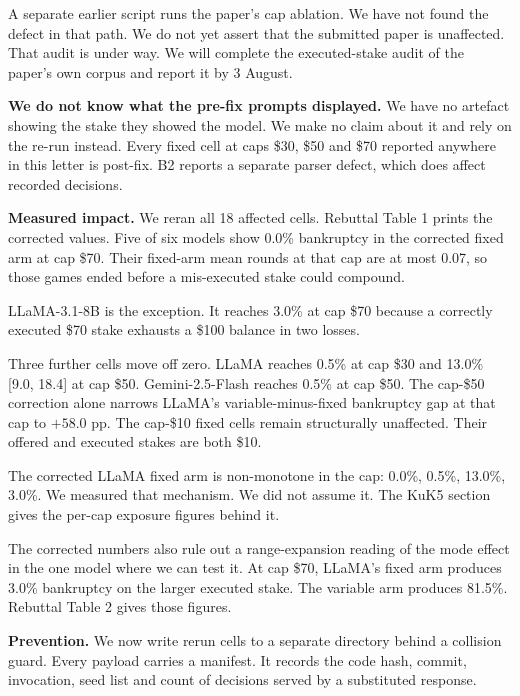 A separate earlier script runs the paper's cap ablation. We have not found the defect in that path.
We do not yet assert that the submitted paper is unaffected. That audit is under way. We will
complete the executed-stake audit of the paper's own corpus and report it by 3 August.

\textbf{We do not know what the pre-fix prompts displayed.} We have no artefact showing the stake
they showed the model. We make no claim about it and rely on the re-run instead. Every fixed cell
at caps \$30, \$50 and \$70 reported anywhere in this letter is post-fix. B2 reports a separate
parser defect, which does affect recorded decisions.

\textbf{Measured impact.} We reran all 18 affected cells. Rebuttal Table 1 prints the corrected
values. Five of six models show 0.0\% bankruptcy in the corrected fixed arm at cap \$70. Their
fixed-arm mean rounds at that cap are at most 0.07, so those games ended before a mis-executed
stake could compound.

LLaMA-3.1-8B is the exception. It reaches 3.0\% at cap \$70 because a correctly executed \$70 stake
exhausts a \$100 balance in two losses.

Three further cells move off zero. LLaMA reaches 0.5\% at cap \$30 and 13.0\% [9.0, 18.4] at cap
\$50. Gemini-2.5-Flash reaches 0.5\% at cap \$50. The cap-\$50 correction alone narrows LLaMA's
variable-minus-fixed bankruptcy gap at that cap to $+58.0$ pp. The cap-\$10 fixed cells remain
structurally unaffected. Their offered and executed stakes are both \$10.

The corrected LLaMA fixed arm is non-monotone in the cap: 0.0\%, 0.5\%, 13.0\%, 3.0\%. We measured
that mechanism. We did not assume it. The KuK5 section gives the per-cap exposure figures behind
it.

The corrected numbers also rule out a range-expansion reading of the mode effect in the one model
where we can test it. At cap \$70, LLaMA's fixed arm produces 3.0\% bankruptcy on the larger
executed stake. The variable arm produces 81.5\%. Rebuttal Table 2 gives those figures.

\textbf{Prevention.} We now write rerun cells to a separate directory behind a collision guard.
Every payload carries a manifest. It records the code hash, commit, invocation, seed list and
count of decisions served by a substituted response.


